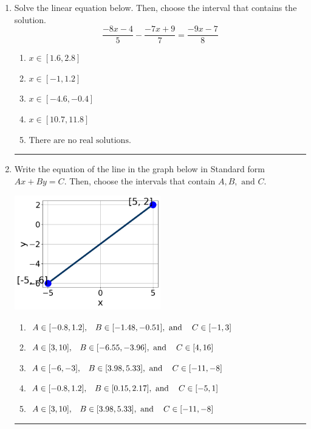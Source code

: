 \documentclass[14pt]{extbook}
\newcommand{\litem}[1]{\item#1\hspace*{-1cm}\rule{\textwidth}{0.4pt}}
\begin{document}
\begin{enumerate}
{\begin{enumerate}[label=\Alph*.]
\end{enumerate} }
\litem{
Solve the linear equation below. Then, choose the interval that contains the solution.\[ \frac{-8x -4}{5} - \frac{-7x + 9}{7} = \frac{-9x -7}{8} \]\begin{enumerate}[label=\Alph*.]
\item \( x \in [1.6, 2.8] \)
\item \( x \in [-1, 1.2] \)
\item \( x \in [-4.6, -0.4] \)
\item \( x \in [10.7, 11.8] \)
\item \( \text{There are no real solutions.} \)

\end{enumerate} }
\litem{
Write the equation of the line in the graph below in Standard form $Ax+By=C$. Then, choose the intervals that contain $A, B, \text{ and } C$.
\begin{center}
    \includegraphics[width=0.5\textwidth]{../Figures/linearGraphToStandardCopyB.png}
\end{center}
\begin{enumerate}[label=\Alph*.]
\item \( A \in [-0.8, 1.2], \hspace{3mm} B \in [-1.48, -0.51], \text{ and } \hspace{3mm} C \in [-1, 3] \)
\item \( A \in [3, 10], \hspace{3mm} B \in [-6.55, -3.96], \text{ and } \hspace{3mm} C \in [4, 16] \)
\item \( A \in [-6, -3], \hspace{3mm} B \in [3.98, 5.33], \text{ and } \hspace{3mm} C \in [-11, -8] \)
\item \( A \in [-0.8, 1.2], \hspace{3mm} B \in [0.15, 2.17], \text{ and } \hspace{3mm} C \in [-5, 1] \)
\item \( A \in [3, 10], \hspace{3mm} B \in [3.98, 5.33], \text{ and } \hspace{3mm} C \in [-11, -8] \)


\end{enumerate}}
\end{enumerate}
\end{document}
